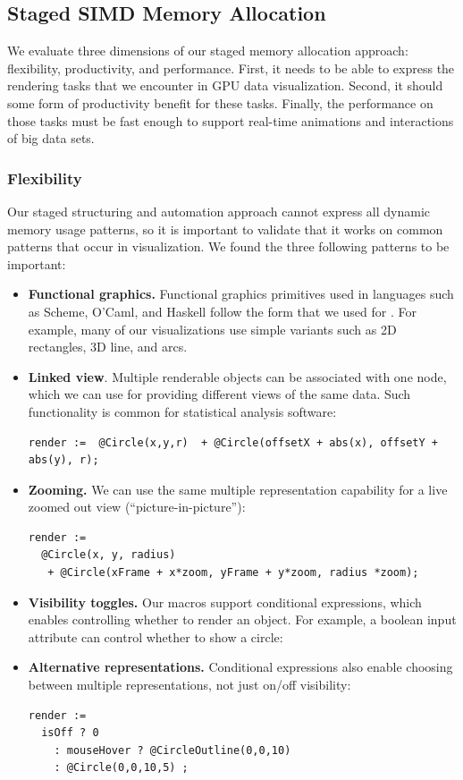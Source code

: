 \subsection{Staged SIMD Memory Allocation}
We evaluate three dimensions of our staged memory allocation approach: flexibility, productivity, and performance. First, it needs to be able to express the rendering tasks that we encounter in GPU data visualization. Second, it should some form of productivity benefit for these tasks. Finally, the performance on those tasks must be fast  enough to support real-time animations and interactions of big data sets.

\subsubsection{Flexibility}
Our staged structuring and automation approach cannot express all dynamic memory usage patterns, so it is important to validate that it works on common patterns that occur in visualization. We found the three following patterns to be important:

\begin{itemize}
\item \textbf{Functional graphics.} Functional graphics primitives used in languages such as Scheme, O'Caml, and Haskell follow the form that we used for . For example, many of our visualizations use simple variants such as 2D rectangles,  3D line, and arcs.
\item \textbf{Linked view}. Multiple renderable objects can be associated with one node, which we can use for providing different views of the same data. Such functionality is common for statistical analysis software:

\begin{lstlisting}[mathescape]
render :=  @Circle(x,y,r)  + @Circle(offsetX + abs(x), offsetY + abs(y), r);
\end{lstlisting}

\item \textbf{Zooming.} We can use the same multiple representation capability for a live zoomed out view (``picture-in-picture''):

\begin{lstlisting}[mathescape]
render :=  
  @Circle(x, y, radius) 
   + @Circle(xFrame + x*zoom, yFrame + y*zoom, radius *zoom);
\end{lstlisting}

\item \textbf{Visibility toggles.} Our macros support conditional expressions, which enables controlling whether to render an object. For example, a boolean input attribute can control whether to show a circle: 
\item \textbf{Alternative representations.} Conditional expressions also enable choosing between multiple representations, not just on/off visibility:
\begin{lstlisting}[mathescape]
render := 
  isOff ? 0
    : mouseHover ? @CircleOutline(0,0,10) 
    : @Circle(0,0,10,5) ;
\end{lstlisting}

\end{itemize}

